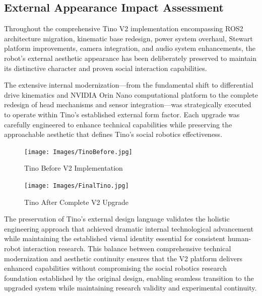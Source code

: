 \subsection{External Appearance Impact Assessment}

Throughout the comprehensive Tino V2 implementation encompassing ROS2 architecture migration, kinematic base redesign, power system overhaul, Stewart platform improvements, camera integration, and audio system enhancements, the robot's external aesthetic appearance has been deliberately preserved to maintain its distinctive character and proven social interaction capabilities.

The extensive internal modernization—from the fundamental shift to differential drive kinematics and NVIDIA Orin Nano computational platform to the complete redesign of head mechanisms and sensor integration—was strategically executed to operate within Tino's established external form factor. Each upgrade was carefully engineered to enhance technical capabilities while preserving the approachable aesthetic that defines Tino's social robotics effectiveness.

\begin{figure}[H]
    \centering
    \begin{minipage}{0.45\textwidth}
        \centering
        \texttt{[image: Images/TinoBefore.jpg]}
        \caption{Tino Before V2 Implementation}
        \label{fig:tino_before_upgrade}
    \end{minipage}
    \hfill
    \begin{minipage}{0.45\textwidth}
        \centering
        \texttt{[image: Images/FinalTino.jpg]}
        \caption{Tino After Complete V2 Upgrade}
        \label{fig:tino_after_upgrade}
    \end{minipage}
\end{figure}

The preservation of Tino's external design language validates the holistic engineering approach that achieved dramatic internal technological advancement while maintaining the established visual identity essential for consistent human-robot interaction research. This balance between comprehensive technical modernization and aesthetic continuity ensures that the V2 platform delivers enhanced capabilities without compromising the social robotics research foundation established by the original design, enabling seamless transition to the upgraded system while maintaining research validity and experimental continuity.
